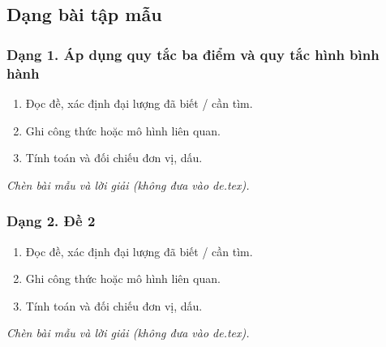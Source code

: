 

\subsection{Dạng bài tập mẫu}
\subsubsection{Dạng 1. Áp dụng quy tắc ba điểm và quy tắc hình bình hành}
\begin{phuongphap}
\begin{enumerate}
\item Đọc đề, xác định đại lượng đã biết / cần tìm.
\item Ghi công thức hoặc mô hình liên quan.
\item Tính toán và đối chiếu đơn vị, dấu.
\end{enumerate}
\end{phuongphap}
\begin{vidumau}
\textit{Chèn bài mẫu và lời giải (không đưa vào de.tex).}
\end{vidumau}

\subsubsection{Dạng 2. Đề 2}
\begin{phuongphap}
\begin{enumerate}
\item Đọc đề, xác định đại lượng đã biết / cần tìm.
\item Ghi công thức hoặc mô hình liên quan.
\item Tính toán và đối chiếu đơn vị, dấu.
\end{enumerate}
\end{phuongphap}
\begin{vidumau}
\textit{Chèn bài mẫu và lời giải (không đưa vào de.tex).}
\end{vidumau}

